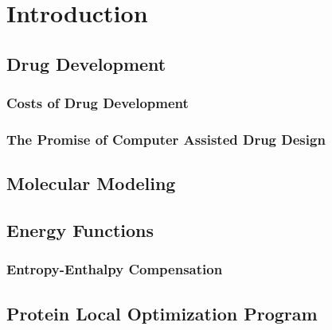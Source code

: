 \chapter{Introduction}
\label{chapter:intro}

\section{Drug Development}
\label{section:drug_development}

\subsection{Costs of Drug Development}
\label{subsection:costs_of_drug_development}


\subsection{The Promise of Computer Assisted Drug Design}
\label{subsection:computer_assisted_drug_design}


\section{Molecular Modeling}
\label{section:molecular_modeling}

\section{Energy Functions}
\label{section:energy_functions}

\subsection{Entropy-Enthalpy Compensation}
\label{subsection:entropy_enthalpy}

\section{Protein Local Optimization Program}
\label{section:protein_local_optimization_program}
